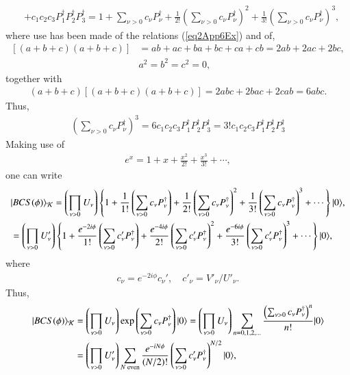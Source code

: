 \begin{subappendices}
\begin{align}
&+c_1c_2c_3P_1^\dagger P_2^\dagger P_3^\dagger=1+\sum_{\nu>0}c_\nu P_\nu^\dagger + \frac{1}{2!}\left(\sum_{\nu>0}c_\nu P^\dagger_\nu\right)^2+\frac{1}{3!}\left(\sum_{\nu>0}c_\nu P^\dagger_\nu\right)^3,
\end{align}
where use has been made of the relations (\ref{eq2App6Ex}) and of,
\begin{align}
\nonumber \left[\left(a+b+c\right)\left(a+b+c\right)\right]&=ab+ac+ba +bc+ca+cb=2ab+2ac+2bc,\\
\nonumber & a^2=b^2=c^2=0,
\end{align}
together with
\begin{align}\label{eq2App9Ex}
 (a+b+c)\left[\left(a+b+c\right)\left(a+b+c\right)\right]=2abc+2bac+2cab=6abc.
\end{align}
Thus,
\begin{align}\label{eq2App10Ex}
\left(\sum_{\nu>0}c_\nu P_\nu^\dagger\right)^3=6c_1c_2c_3P_1^\dagger P_2^\dagger P_3^\dagger=3!c_1c_2c_3P_1^\dagger P_2^\dagger P_3^\dagger
\end{align}
Making use of
\begin{align}\label{eq2App11Ex}
e^x=1+x+\frac{x^2}{2!}+\frac{x^3}{3!}+\cdots,
\end{align}
one can write
\begin{align}\label{eq1App11Ex} 
\nonumber &|{BCS(\phi)} \rangle_{\mathcal K}=\left(\prod_{\nu>0}U_\nu\right)\left\{1+\frac{1}{1!}\left(\sum_{\nu>0}c_\nu P_\nu^\dagger\right)+\frac{1}{2!}\left(\sum_{\nu>0}c_\nu P_\nu^\dagger\right)^2+\frac{1}{3!}\left(\sum_{\nu>0}c_\nu P_\nu^\dagger\right)^3+\cdots\right\}|{0} \rangle,\\
&=\left(\prod_{\nu>0}U'_\nu\right)\left\{1+\frac{e^{-2i\phi}}{1!}\left(\sum_{\nu>0}c'_\nu P_\nu^\dagger\right)+\frac{e^{-4i\phi}}{2!}\left(\sum_{\nu>0}c'_\nu P_\nu^\dagger\right)^2+\frac{e^{-6i\phi}}{3!}\left(\sum_{\nu>0}c'_\nu P_\nu^\dagger\right)^3+\cdots\right\}|{0} \rangle,
\end{align}
where
\begin{align}\label{eq2App12Ex}
 c_\nu=e^{-2i\phi}c_\nu',\quad c'_\nu=V'_\nu/U'_\nu.
\end{align}
Thus,
\begin{align}\label{eq2App13Ex}
\nonumber\ket{BCS(\phi)}_{\mathcal K}&=\left(\prod_{\nu>0}U_\nu\right)\exp\left(\sum_{\nu>0}c_\nu P_\nu^\dagger\right)\ket{0}=\left(\prod_{\nu>0}U_\nu\right)\sum_{n=0,1,2,\dots}\frac{\left(\sum_{\nu>0}c_\nu P^\dagger_\nu\right)^n}{n!}\ket{0}\\
&=\left(\prod_{\nu>0}U'_\nu\right)\sum_{N \text{ even}}\frac{e^{-iN\phi}}{(N/2)!}\left(\sum_{\nu>0}c'_\nu P_\nu^\dagger\right)^{N/2}\ket{0},

\end{align}
\end{subappendices}

